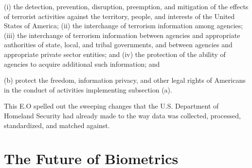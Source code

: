\documentclass[sigconf]{acmart}
\begin{document}
        (i) the detection, prevention, disruption, preemption, and mitigation of the effects of terrorist activities against the territory, people, and interests of the United States of America; 
        (ii) the interchange of terrorism information among agencies; 
        (iii) the interchange of terrorism information between agencies and appropriate authorities of state, local, and tribal governments, and between agencies and appropriate private sector entities; and 
        (iv) the protection of the ability of agencies to acquire additional such information; and 
        
    (b) protect the freedom, information privacy, and other legal rights of Americans in the conduct of activities implementing subsection (a). 
    
This E.O spelled out the sweeping changes that the U.S. Department of Homeland Security had already made to the way data was collected, processed, standardized, and matched against. 

\section{The Future of Biometrics}




 
\end{document}
